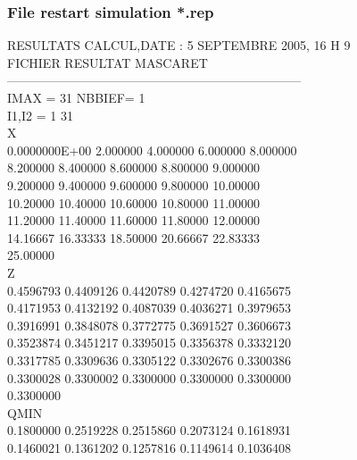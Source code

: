 \documentclass[a4paper,12pt]{article}
\begin{document}
\subsubsection{File restart simulation *.rep} 
\vspace{0.5cm}
RESULTATS CALCUL,DATE :  5 SEPTEMBRE 2005, 16 H  9\\
FICHIER RESULTAT MASCARET  \\                                             
----------------------------------------------------------------------- \\
 IMAX  =   31 NBBIEF=    1\\
 I1,I2 =    1   31\\
 X\\
  0.0000000E+00   2.000000       4.000000       6.000000       8.000000  \\  
   8.200000       8.400000       8.600000       8.800000       9.000000    \\
   9.200000       9.400000       9.600000       9.800000       10.00000    \\
   10.20000       10.40000       10.60000       10.80000       11.00000   \\ 
   11.20000       11.40000       11.60000       11.80000       12.00000   \\ 
   14.16667       16.33333       18.50000       20.66667       22.83333  \\  
   25.00000    \\
 Z\\
  0.4596793      0.4409126      0.4420789      0.4274720      0.4165675   \\ 
  0.4171953      0.4132192      0.4087039      0.4036271      0.3979653   \\ 
  0.3916991      0.3848078      0.3772775      0.3691527      0.3606673   \\ 
  0.3523874      0.3451217      0.3395015      0.3356378      0.3332120    \\
  0.3317785      0.3309636      0.3305122      0.3302676      0.3300386    \\
  0.3300028      0.3300002      0.3300000      0.3300000      0.3300000   \\ 
  0.3300000    \\
 QMIN\\
  0.1800000      0.2519228      0.2515860      0.2073124      0.1618931   \\ 
  0.1460021      0.1361202      0.1257816      0.1149614      0.1036408   \\ 
\end{document}
